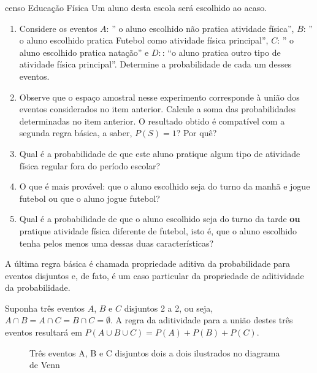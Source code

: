 \begin{task}{censo Educação Física}
Um aluno desta escola será escolhido ao acaso.
\begin{enumerate}
\item {} 
Considere os eventos \(A\):  ” o aluno escolhido não pratica atividade física”, \(B\): ” o aluno escolhido pratica Futebol como atividade física principal”, \(C\): ” o aluno escolhido pratica natação” e \(D:\): “o aluno pratica outro tipo de atividade física principal”. Determine a probabilidade de cada um desses eventos.

\item {} 
Observe que o espaço amostral nesse experimento corresponde à união dos eventos considerados no item anterior. Calcule a soma das probabilidades determinadas no item anterior. O resultado obtido é compatível com a segunda regra básica, a saber, \(P(S)=1\)? Por quê?

\item {} 
Qual é a probabilidade de que este aluno pratique algum tipo de atividade física regular fora do período escolar?

\item {} 
O que é mais provável: que o aluno escolhido seja do turno da manhã e jogue futebol ou que o aluno jogue futebol?

\item {} 
Qual é a probabilidade de que o aluno escolhido seja do turno da tarde \textbf{ou} pratique atividade física diferente de futebol, isto é, que o aluno escolhido tenha pelos menos uma dessas duas características?

\end{enumerate}
\end{task}



A última regra básica é chamada propriedade aditiva da probabilidade para eventos disjuntos e, de fato, é um caso particular da propriedade de aditividade da probabilidade.

Suponha três eventos \(A\), \(B\) e \(C\) disjuntos 2 a 2, ou seja, \(A\cap B=A\cap C=B\cap C=\emptyset\). A regra da aditividade para a união destes três eventos resultará em \(P(A\cup B\cup C)=P(A)+P(B)+P(C)\).
\begin{figure}[H]
\centering


\caption{Três eventos A, B e C disjuntos dois a dois ilustrados no diagrama de Venn}

\end{figure}

